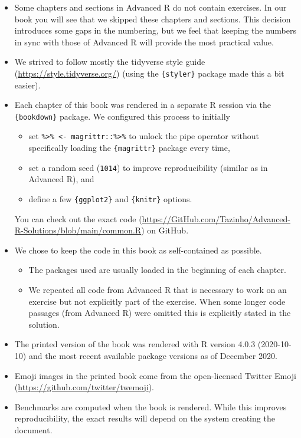 \documentclass[
]{krantz}
\providecommand{\tightlist}{%
  \setlength{\itemsep}{0pt}\setlength{\parskip}{0pt}}
\renewcommand{\href}[2]{#2 (\url{#1})}
\begin{document}
\begin{itemize}
\tightlist
\item
  Some chapters and sections in Advanced R do not contain exercises. In our book you will see that we skipped these chapters and sections. This decision introduces some gaps in the numbering, but we feel that keeping the numbers in sync with those of Advanced R will provide the most practical value.
\item
  We strived to follow mostly the \href{https://style.tidyverse.org/}{tidyverse style guide} (using the \texttt{\{styler\}} package \citep{styler} made this a bit easier).
\item
  Each chapter of this book was rendered in a separate R session via the \texttt{\{bookdown\}} package. We configured this process to initially

  \begin{itemize}
  \tightlist
  \item
    set \texttt{\textasciigrave{}\%\textgreater{}\%\textasciigrave{}\ \textless{}-\ magrittr::\textasciigrave{}\%\textgreater{}\%\textasciigrave{}} to unlock the pipe operator without specifically loading the \texttt{\{magrittr\}} package \citep{magrittr} every time,
  \item
    set a random seed (\texttt{1014}) to improve reproducibility (similar as in Advanced R), and
  \item
    define a few \texttt{\{ggplot2\}} and \texttt{\{knitr\}} options.
  \end{itemize}

  You can check out the \href{https://GitHub.com/Tazinho/Advanced-R-Solutions/blob/main/common.R}{exact code} on GitHub.
\item
  We chose to keep the code in this book as self-contained as possible.

  \begin{itemize}
  \tightlist
  \item
    The packages used are usually loaded in the beginning of each chapter.
  \item
    We repeated all code from Advanced R that is necessary to work on an exercise but not explicitly part of the exercise. When some longer code passages (from Advanced R) were omitted this is explicitly stated in the solution.
  \end{itemize}
\item
  The printed version of the book was rendered with R version 4.0.3 (2020-10-10) and the most recent available package versions as of December 2020.
\item
  Emoji images in the printed book come from the open-licensed \href{https://github.com/twitter/twemoji}{Twitter Emoji}.
\item
  Benchmarks are computed when the book is rendered. While this improves reproducibility, the exact results will depend on the system creating the document.
\end{itemize}
\end{document}
